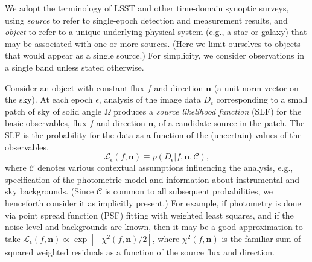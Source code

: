 \documentclass[twocolumn]{emulateapj}
\newcommand{\ctxt}{\mathcal{C}}  %
\newcommand{\eind}{\epsilon}  %
\newcommand{\edata}{D_\eind}  %
\newcommand{\like}{\mathcal{L}}  %
\newcommand{\flux}{f}
\newcommand{\drxn}{\mathbf{n}}
\begin{document}
\noindent 


We adopt the terminology of LSST and other time-domain synoptic surveys, using \emph{source} to refer to single-epoch detection and measurement results, and \emph{object} to refer to a unique underlying physical system (e.g., a star or galaxy) that may be associated with one or more sources.
(Here we limit ourselves to objects that would appear as a single source.)
For simplicity, we consider observations in a single band unless stated otherwise.

Consider an object with constant flux $f$ and direction $\drxn$ (a unit-norm vector on the sky). 
At each epoch $\eind$, analysis of the image data $\edata$ corresponding to a small patch of sky of solid angle $\Omega$ produces a \emph{source likelihood function} (SLF) for the basic observables, flux $\flux$ and direction $\drxn$, of a candidate source in the patch.
The SLF is the probability for the data as a function of the (uncertain) values of the observables,
\begin{equation}
\like_\eind(\flux,\drxn) \equiv p(\edata|\flux,\drxn,\ctxt),
\label{like-def}
\end{equation}
where $\ctxt$ denotes various contextual assumptions influencing the analysis,
e.g., specification of the photometric model and information about instrumental and sky backgrounds.
(Since $\ctxt$ is common to all subsequent probabilities, we henceforth consider it as implicitly present.)
For example, if photometry is done via point spread function (PSF) fitting with weighted least squares, and if the noise level and backgrounds are known, then it may be a good approximation to take $\like_\eind(\flux,\drxn) \propto \exp[-\chi^2(\flux, \drxn)/2]$, where $\chi^2(\flux, \drxn)$ is the familiar sum of squared weighted residuals as a function of the source flux and direction.
\end{document}
